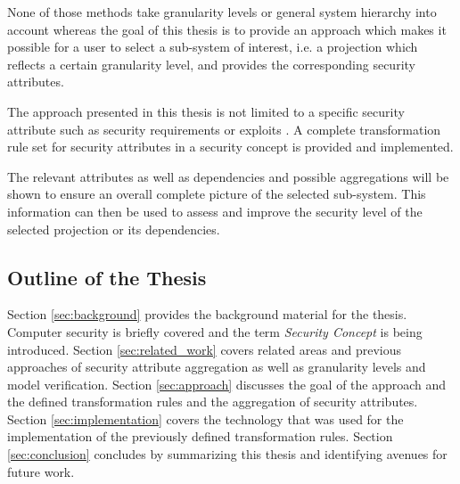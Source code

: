 None of those methods take granularity levels or general system hierarchy into account whereas the goal of this thesis is to provide an approach which makes it possible for a user to select a sub-system of interest, i.e. a projection which reflects a certain granularity level, and provides the corresponding security attributes.

The approach presented in this thesis is not limited to a specific security attribute such as security requirements \cite{Menzel2008} or exploits \cite{Noel:2004:MAG:1029208.1029225}. A complete transformation rule set for security attributes in a security concept is provided and implemented.

The relevant attributes as well as dependencies and possible aggregations will be shown to ensure an overall complete picture of the selected sub-system. This information can then be used to assess and improve the security level of the selected projection or its dependencies.

\subsection{Outline of the Thesis}

Section \ref{sec:background} provides the background material for the thesis. Computer security is briefly covered and the term \textit{Security Concept} is being introduced. Section \ref{sec:related_work} covers related areas and previous approaches of security attribute aggregation as well as granularity levels and model verification. Section \ref{sec:approach} discusses the goal of the approach and the defined transformation rules and the aggregation of security attributes. Section \ref{sec:implementation} covers the technology that was used for the implementation of the previously defined transformation rules. Section \ref{sec:conclusion} concludes by summarizing this thesis and identifying avenues for future work. 